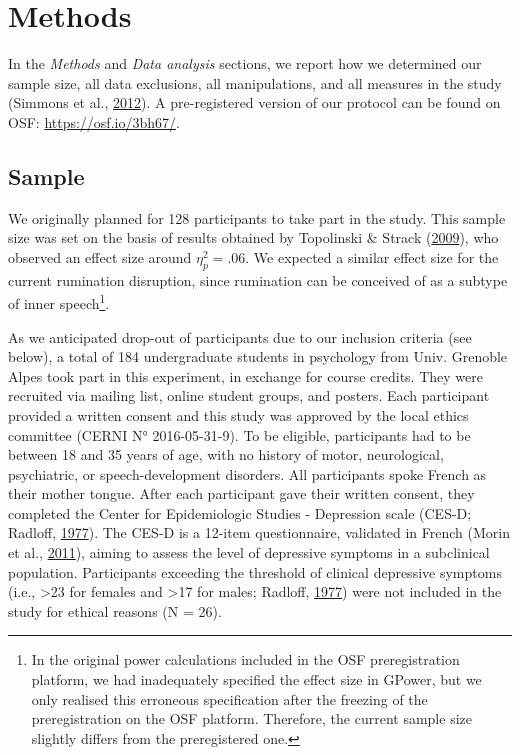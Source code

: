 \documentclass[a4paper,12pt,twoside,openright,oldfontcommands,final]{memoir}
\let\rmarkdownfootnote\footnote%
\def\footnote{\protect\rmarkdownfootnote}
\begin{document}
\hypertarget{methods-3}{%
\section{Methods}\label{methods-3}}

In the \emph{Methods} and \emph{Data analysis} sections, we report how we determined our sample size, all data exclusions, all manipulations, and all measures in the study (Simmons et al., \protect\hyperlink{ref-simmons_21_2012}{2012}). A pre-registered version of our protocol can be found on OSF: \url{https://osf.io/3bh67/}.

\hypertarget{sample}{%
\subsection{Sample}\label{sample}}

We originally planned for 128 participants to take part in the study. This sample size was set on the basis of results obtained by Topolinski \& Strack (\protect\hyperlink{ref-topolinski_motormouth_2009}{2009}), who observed an effect size around \(\eta_{p}^{2}=.06\). We expected a similar effect size for the current rumination disruption, since rumination can be conceived of as a subtype of inner speech\footnote{In the original power calculations included in the OSF preregistration platform, we had inadequately specified the effect size in GPower, but we only realised this erroneous specification after the freezing of the preregistration on the OSF platform. Therefore, the current sample size slightly differs from the preregistered one.}.

As we anticipated drop-out of participants due to our inclusion criteria (see below), a total of 184 undergraduate students in psychology from Univ. Grenoble Alpes took part in this experiment, in exchange for course credits. They were recruited via mailing list, online student groups, and posters. Each participant provided a written consent and this study was approved by the local ethics committee (CERNI N° 2016-05-31-9). To be eligible, participants had to be between 18 and 35 years of age, with no history of motor, neurological, psychiatric, or speech-development disorders. All participants spoke French as their mother tongue. After each participant gave their written consent, they completed the Center for Epidemiologic Studies - Depression scale (CES-D; Radloff, \protect\hyperlink{ref-radloff_ces-d_1977}{1977}). The CES-D is a 12-item questionnaire, validated in French (Morin et al., \protect\hyperlink{ref-morin_psychometric_2011}{2011}), aiming to assess the level of depressive symptoms in a subclinical population. Participants exceeding the threshold of clinical depressive symptoms (i.e., \textgreater23 for females and \textgreater17 for males; Radloff, \protect\hyperlink{ref-radloff_ces-d_1977}{1977}) were not included in the study for ethical reasons (N = 26).
\end{document}
